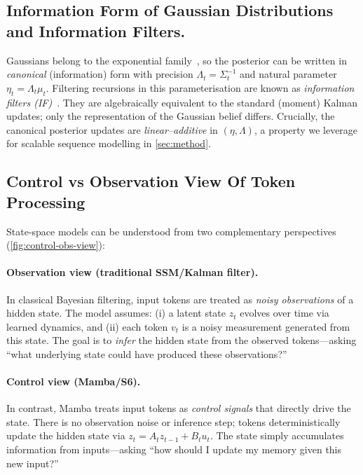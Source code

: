 \documentclass{article}
\begin{document}
\subsection{Information Form of Gaussian Distributions and Information Filters.}
\label{sec:information-form}
Gaussians belong to the exponential family~\citep{nielsen2009statistical}, so the posterior can be written in \emph{canonical} (information) form with precision $\Lambda_t \!=\! \Sigma_t^{-1}$ and natural parameter $\eta_t \!=\! \Lambda_t \mu_t$.
Filtering recursions in this parameterisation are known as \emph{information filters (IF)}~\citep{anderson2005optimal,khan2005matrix}.
They are algebraically equivalent to the standard (moment) Kalman updates; only the representation of the Gaussian belief differs.
Crucially, the canonical posterior updates are \emph{linear--additive} in $(\eta,\Lambda)$, a property we leverage for scalable sequence modelling in \cref{sec:method}.

\subsection{Control vs Observation View Of Token Processing}
\label{app:control-obs-view}

State-space models can be understood from two complementary perspectives (\cref{fig:control-obs-view}):

\paragraph{Observation view (traditional SSM/Kalman filter).}
In classical Bayesian filtering, input tokens are treated as \emph{noisy observations} of a hidden state.
The model assumes: (i) a latent state $z_t$ evolves over time via learned dynamics, and (ii) each token $v_t$ is a noisy measurement generated from this state.
The goal is to \emph{infer} the hidden state from the observed tokens---asking ``what underlying state could have produced these observations?''

\paragraph{Control view (Mamba/S6).}
In contrast, Mamba treats input tokens as \emph{control signals} that directly drive the state.
There is no observation noise or inference step; tokens deterministically update the hidden state via $z_t = A_t z_{t-1} + B_t u_t$.
The state simply accumulates information from inputs---asking ``how should I update my memory given this new input?''
\end{document}
